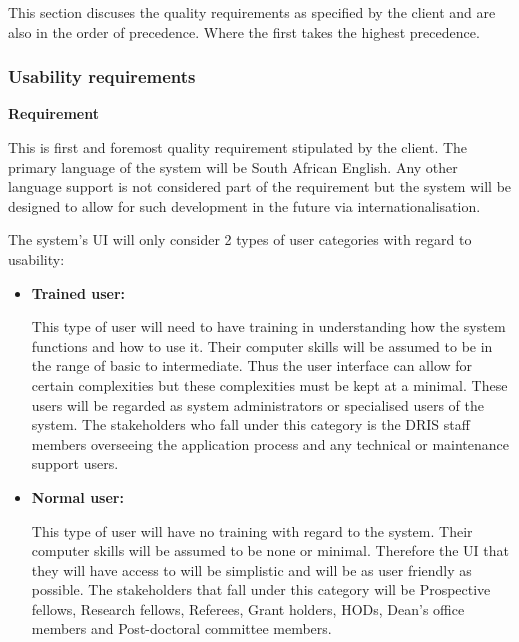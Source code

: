 This section discuses the quality requirements as specified by the client and are also in the order of precedence. Where the first takes the highest precedence.

\subsubsection{Usability requirements}

\begin{flushleft}
\vspace{0.1in}

\textbf{Requirement}

This is first and foremost quality requirement stipulated by the client. The primary language of the system will be South African English. Any other language support is not considered part of the requirement but the system will be designed to allow for such development in the future via internationalisation.\\

\vspace{0.1in}

The system's UI will only consider 2 types of user categories with regard to usability:

\begin{itemize}

\item\textbf{Trained user:}

This type of user will need to have training in understanding how the system functions and how to use it. Their computer skills will be assumed to be in the range of basic to intermediate. Thus the user interface can allow for certain complexities but these complexities must be kept at a minimal. These users will be regarded as system administrators or specialised users of the system. The stakeholders who fall under this category is the DRIS staff members overseeing the application process and any technical or maintenance support users.

\item\textbf{Normal user:}

This type of user will have no training with regard to the system. Their computer skills will be assumed to be none or minimal. Therefore the UI that they will have access to will be simplistic and will be as user friendly as possible. The stakeholders that fall under this category will be Prospective fellows, Research fellows, Referees, Grant holders, HODs, Dean's office members and Post-doctoral committee members.


\end{itemize}
\end{flushleft}
